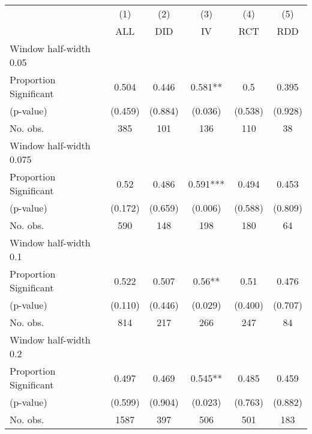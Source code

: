 
\def\sym#1{\ifmmode^{#1}\else\(^{#1}\)\fi}
\begin{tabular}{l*{5}{c}}
\hline\hline
& \multicolumn{1}{c}{(1)} &  \multicolumn{1}{c}{(2)} &  \multicolumn{1}{c}{(3)} &  \multicolumn{1}{c}{(4)} &  \multicolumn{1}{c}{(5)}\\
& \multicolumn{1}{c}{ALL} &  \multicolumn{1}{c}{DID} &  \multicolumn{1}{c}{IV} &  \multicolumn{1}{c}{RCT} &  \multicolumn{1}{c}{RDD}\\

\hline
\hline
Window half-width 0.05\\

Proportion Significant& 0.504 &  0.446 &  0.581** &  0.5 &  0.395\\

(p-value) & (0.459) &  (0.884) &  (0.036) &  (0.538) &  (0.928)\\

No. obs.& 385 &  101 &  136 &  110 &  38\\

\hline
Window half-width 0.075\\

Proportion Significant& 0.52 &  0.486 &  0.591*** &  0.494 &  0.453\\

(p-value) & (0.172) &  (0.659) &  (0.006) &  (0.588) &  (0.809)\\

No. obs.& 590 &  148 &  198 &  180 &  64\\

\hline
Window half-width 0.1\\

Proportion Significant& 0.522 &  0.507 &  0.56** &  0.51 &  0.476\\

(p-value) & (0.110) &  (0.446) &  (0.029) &  (0.400) &  (0.707)\\

No. obs.& 814 &  217 &  266 &  247 &  84\\

\hline
Window half-width 0.2\\

Proportion Significant& 0.497 &  0.469 &  0.545** &  0.485 &  0.459\\

(p-value) & (0.599) &  (0.904) &  (0.023) &  (0.763) &  (0.882)\\

No. obs.& 1587 &  397 &  506 &  501 &  183\\


\end{tabular}
